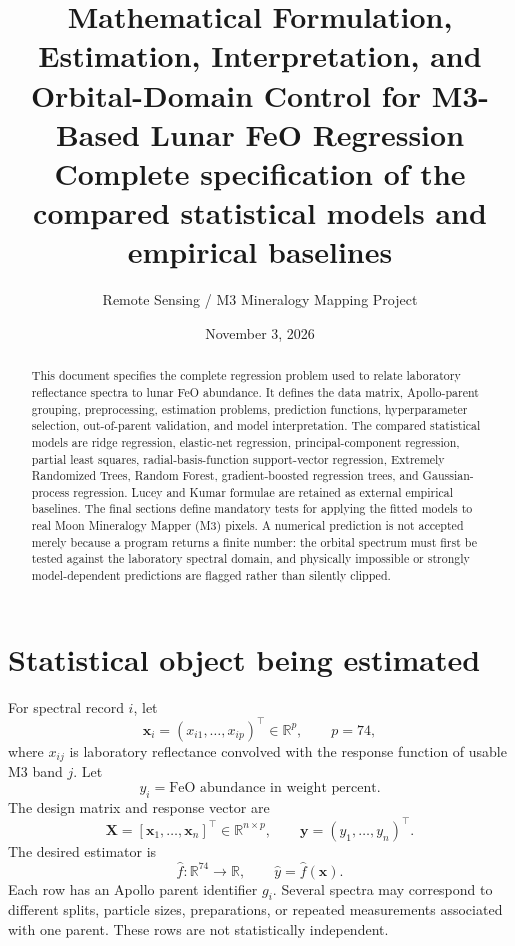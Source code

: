 \documentclass[11pt]{article}
\title{\vspace{-1.8em}\textbf{Mathematical Formulation, Estimation, Interpretation, and Orbital-Domain Control for M3-Based Lunar FeO Regression}\\[0.45em]
\large Complete specification of the compared statistical models and empirical baselines}
\author{Remote Sensing / M3 Mineralogy Mapping Project}
\date{November 3, 2026}
\newcommand{\R}{\mathbb{R}}
\begin{document}
\maketitle\vspace{-1.2em}
\begin{abstract}
This document specifies the complete regression problem used to relate laboratory reflectance spectra to lunar FeO abundance. It defines the data matrix, Apollo-parent grouping, preprocessing, estimation problems, prediction functions, hyperparameter selection, out-of-parent validation, and model interpretation. The compared statistical models are ridge regression, elastic-net regression, principal-component regression, partial least squares, radial-basis-function support-vector regression, Extremely Randomized Trees, Random Forest, gradient-boosted regression trees, and Gaussian-process regression. Lucey and Kumar formulae are retained as external empirical baselines. The final sections define mandatory tests for applying the fitted models to real Moon Mineralogy Mapper (M3) pixels. A numerical prediction is not accepted merely because a program returns a finite number: the orbital spectrum must first be tested against the laboratory spectral domain, and physically impossible or strongly model-dependent predictions are flagged rather than silently clipped.
\end{abstract}
\tableofcontents
\newpage

\section{Statistical object being estimated}
For spectral record $i$, let
\begin{equation}
 \bm x_i=(x_{i1},\ldots,x_{ip})^\top\in\R^p,\qquad p=74,
\end{equation}
where $x_{ij}$ is laboratory reflectance convolved with the response function of usable M3 band $j$. Let
\begin{equation}
 y_i=\text{FeO abundance in weight percent}.
\end{equation}
The design matrix and response vector are
\begin{equation}
 \bm X=[\bm x_1,\ldots,\bm x_n]^\top\in\R^{n\times p},
 \qquad \bm y=(y_1,\ldots,y_n)^\top.
\end{equation}
The desired estimator is
\begin{equation}
 \widehat f:\R^{74}\to\R,\qquad \widehat y=\widehat f(\bm x).
\end{equation}
Each row has an Apollo parent identifier $g_i$. Several spectra may correspond to different splits, particle sizes, preparations, or repeated measurements associated with one parent. These rows are not statistically independent.
\end{document}
